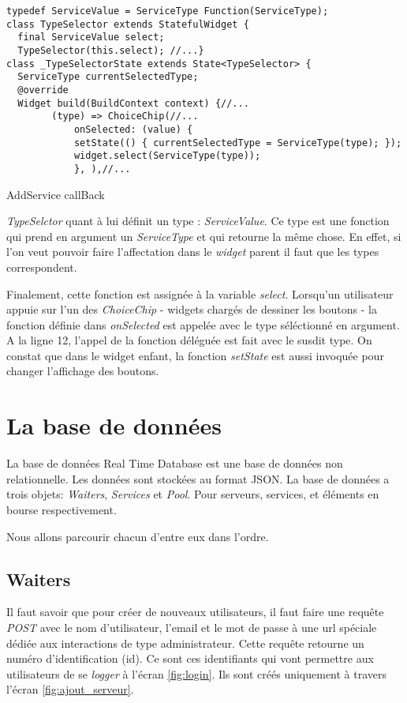 \begin{listing}[!h]
\begin{verbatim}
typedef ServiceValue = ServiceType Function(ServiceType);
class TypeSelector extends StatefulWidget {
  final ServiceValue select;
  TypeSelector(this.select); //...}
class _TypeSelectorState extends State<TypeSelector> {
  ServiceType currentSelectedType;
  @override
  Widget build(BuildContext context) {//...
        (type) => ChoiceChip(//...
            onSelected: (value) {
            setState(() { currentSelectedType = ServiceType(type); });
            widget.select(ServiceType(type));
            }, ),//...
\end{verbatim}
\caption{AddService callBack}
\label{code:TypeSelectorCallback}
\end{listing}
\textit{TypeSelctor} quant à lui définit un type : \textit{ServiceValue}. Ce type est une fonction qui prend en argument un \textit{ServiceType} et qui retourne la même chose. En effet, si l'on veut pouvoir faire l'affectation dans le \textit{widget} parent il faut que les types correspondent.

Finalement, cette fonction est assignée à la variable \textit{select}. Lorsqu'un utilisateur appuie sur l'un des \textit{ChoiceChip} - widgets chargés de dessiner les boutons - la fonction définie dans \textit{onSelected} est appelée avec le type séléctionné en argument. A la ligne 12, l'appel de la fonction déléguée est fait avec le susdit type. On constat que dans le widget enfant, la fonction \textit{setState} est aussi invoquée pour changer l'affichage des boutons.

\section{La base de données}
La base de données Real Time Database est une base de données non relationnelle. Les données sont stockées au format JSON. La base de données a trois objets: \textit{Waiters}, \textit{Services} et \textit{Pool}. Pour serveurs, services, et éléments en bourse respectivement.

Nous allons parcourir chacun d'entre eux dans l'ordre.

\subsection*{Waiters}
Il faut savoir que pour créer de nouveaux utilisateurs, il faut faire une requête \textit{POST} avec le nom d'utilisateur, l'email et le mot de passe à une url spéciale dédiée aux interactions de type administrateur. Cette requête retourne un numéro d'identification (id). Ce sont ces identifiants qui vont permettre aux utilisateurs de se \textit{logger} à l'écran \autoref{fig:login}. Ils sont créés uniquement à travers l'écran \autoref{fig:ajout_serveur}.


